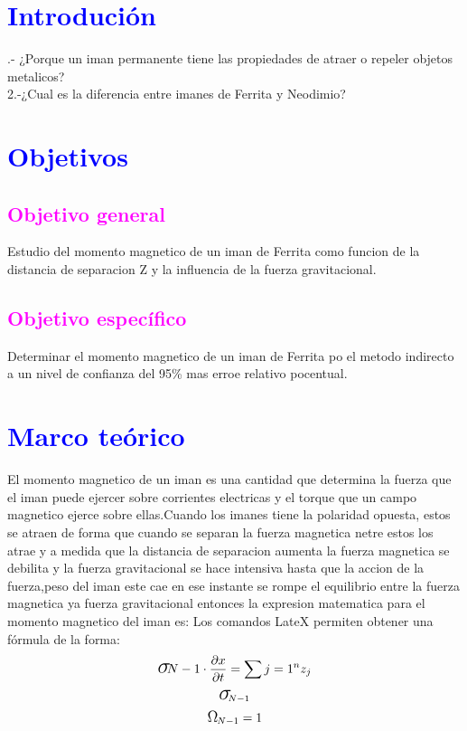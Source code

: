 \documentclass[11pt]{article}
\begin{document}
\begin{multicols}{2}
\section{\textbf{\textcolor{blue}{Introdución}}}
.- ¿Porque un iman permanente tiene las propiedades de atraer o repeler objetos metalicos?\\
2.-¿Cual es la diferencia entre imanes de Ferrita y Neodimio?
\section{\textbf{\textcolor{blue}{Objetivos}}}
\subsection{\textcolor{magenta}{Objetivo general}}
\noindent Estudio del momento magnetico de un iman de Ferrita como funcion de la distancia de separacion Z y la influencia de la fuerza gravitacional.
\subsection{\textbf{\textcolor{magenta}{Objetivo específico}}}
\noindent Determinar el momento magnetico de un iman de Ferrita po el metodo indirecto a un nivel de confianza del 95\% mas erroe relativo pocentual.
\section{\textbf{\textcolor{blue}{Marco teórico}}}
\noindent El momento magnetico de un iman es una cantidad que determina la fuerza que el iman puede ejercer sobre corrientes electricas y el torque que un campo magnetico ejerce sobre ellas.Cuando los imanes tiene la polaridad opuesta, estos se atraen de forma que cuando se separan la fuerza magnetica netre estos los atrae y a medida que la distancia de separacion aumenta la fuerza magnetica se debilita y la fuerza gravitacional se hace intensiva hasta que la accion de la  fuerza,peso del iman este cae en ese instante se rompe el equilibrio entre la fuerza magnetica ya fuerza gravitacional entonces la expresion matematica para el momento magnetico del iman es:
Los comandos LateX permiten obtener una fórmula de la forma: 
\begin{equation}
\textup{\LARGE $\sigma$}{\hspace{-0.1cm}N-1} \cdot \frac{\partial x}{\partial t} = \sum{j=1}^{n}z_{j}
\end{equation}
\begin{equation}
\textup{\LARGE $\sigma$}_{\hspace{-0.1cm}N-1}
\end{equation}
\begin{equation}
\textup{\large $\Omega$}_{\hspace{-0.03cm}N-1}=1
\end{equation}


\end{multicols}
\end{document}
